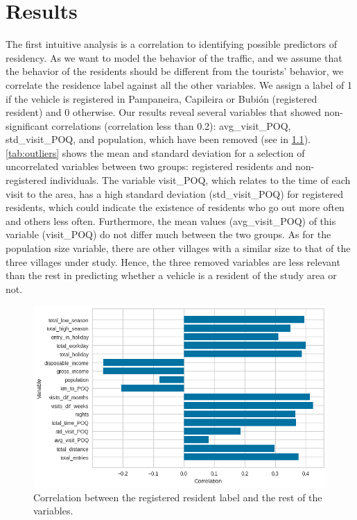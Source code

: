 \chapter{Results} \label{ch:results}

The first intuitive analysis is a correlation to identifying possible predictors of residency. As we want to model the behavior of the traffic, and we assume that the behavior of the residents should be different from the tourists' behavior, we correlate the residence label against all the other variables. We assign a label of 1 if the vehicle is registered in Pampaneira, Capileira or Bubión (registered resident) and 0 otherwise. Our results reveal several variables that showed non-significant correlations (correlation less than 0.2): avg\_visit\_POQ, std\_visit\_POQ, and population, which have been removed (see in \cref{fig:resident_corr}). \cref{tab:outliers} shows the mean and standard deviation for a selection of uncorrelated variables between two groups: registered residents and non-registered individuals. The variable visit\_POQ, which relates to the time of each visit to the area, has a high standard deviation (std\_visit\_POQ) for registered residents, which could indicate the existence of residents who go out more often and others less often. Furthermore, the mean values (avg\_visit\_POQ) of this variable (visit\_POQ) do not differ much between the two groups. As for the population size variable, there are other villages with a similar size to that of the three villages under study. Hence, the three removed variables are less relevant than the rest in predicting whether a vehicle is a resident of the study area or not.

\begin{figure}
\begin{center}
	\includegraphics[width = 0.9 \linewidth]{Images/resident_corr.png}
\end{center}
	\caption{\label{fig:resident_corr} Correlation between the registered resident label and the rest of the variables.}
\end{figure}

